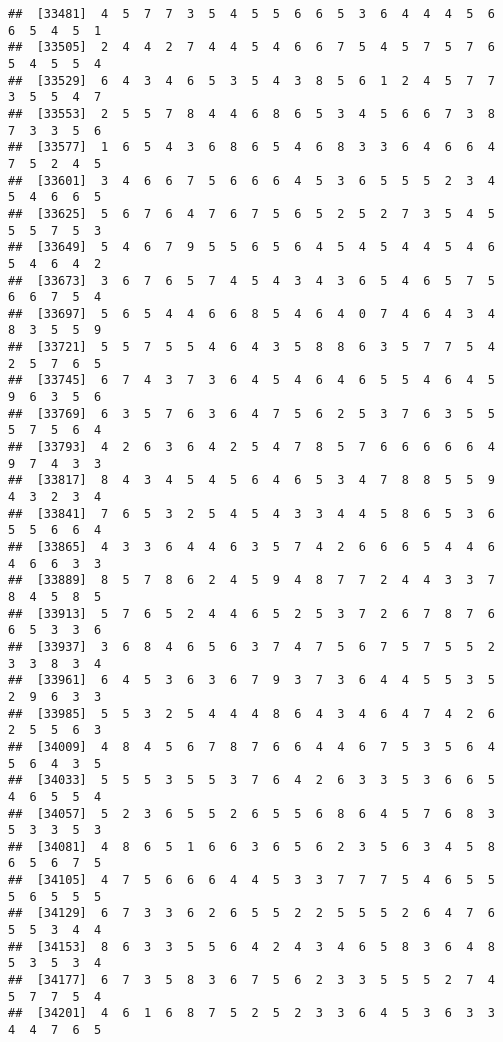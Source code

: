 \documentclass[
]{book}
\begin{document}
\begin{verbatim}
##  [33481]  4  5  7  7  3  5  4  5  5  6  6  5  3  6  4  4  4  5  6  6  5  4  5  1
##  [33505]  2  4  4  2  7  4  4  5  4  6  6  7  5  4  5  7  5  7  6  5  4  5  5  4
##  [33529]  6  4  3  4  6  5  3  5  4  3  8  5  6  1  2  4  5  7  7  3  5  5  4  7
##  [33553]  2  5  5  7  8  4  4  6  8  6  5  3  4  5  6  6  7  3  8  7  3  3  5  6
##  [33577]  1  6  5  4  3  6  8  6  5  4  6  8  3  3  6  4  6  6  4  7  5  2  4  5
##  [33601]  3  4  6  6  7  5  6  6  6  4  5  3  6  5  5  5  2  3  4  5  4  6  6  5
##  [33625]  5  6  7  6  4  7  6  7  5  6  5  2  5  2  7  3  5  4  5  5  5  7  5  3
##  [33649]  5  4  6  7  9  5  5  6  5  6  4  5  4  5  4  4  5  4  6  5  4  6  4  2
##  [33673]  3  6  7  6  5  7  4  5  4  3  4  3  6  5  4  6  5  7  5  6  6  7  5  4
##  [33697]  5  6  5  4  4  6  6  8  5  4  6  4  0  7  4  6  4  3  4  8  3  5  5  9
##  [33721]  5  5  7  5  5  4  6  4  3  5  8  8  6  3  5  7  7  5  4  2  5  7  6  5
##  [33745]  6  7  4  3  7  3  6  4  5  4  6  4  6  5  5  4  6  4  5  9  6  3  5  6
##  [33769]  6  3  5  7  6  3  6  4  7  5  6  2  5  3  7  6  3  5  5  5  7  5  6  4
##  [33793]  4  2  6  3  6  4  2  5  4  7  8  5  7  6  6  6  6  6  4  9  7  4  3  3
##  [33817]  8  4  3  4  5  4  5  6  4  6  5  3  4  7  8  8  5  5  9  4  3  2  3  4
##  [33841]  7  6  5  3  2  5  4  5  4  3  3  4  4  5  8  6  5  3  6  5  5  6  6  4
##  [33865]  4  3  3  6  4  4  6  3  5  7  4  2  6  6  6  5  4  4  6  4  6  6  3  3
##  [33889]  8  5  7  8  6  2  4  5  9  4  8  7  7  2  4  4  3  3  7  8  4  5  8  5
##  [33913]  5  7  6  5  2  4  4  6  5  2  5  3  7  2  6  7  8  7  6  6  5  3  3  6
##  [33937]  3  6  8  4  6  5  6  3  7  4  7  5  6  7  5  7  5  5  2  3  3  8  3  4
##  [33961]  6  4  5  3  6  3  6  7  9  3  7  3  6  4  4  5  5  3  5  2  9  6  3  3
##  [33985]  5  5  3  2  5  4  4  4  8  6  4  3  4  6  4  7  4  2  6  2  5  5  6  3
##  [34009]  4  8  4  5  6  7  8  7  6  6  4  4  6  7  5  3  5  6  4  5  6  4  3  5
##  [34033]  5  5  5  3  5  5  3  7  6  4  2  6  3  3  5  3  6  6  5  4  6  5  5  4
##  [34057]  5  2  3  6  5  5  2  6  5  5  6  8  6  4  5  7  6  8  3  5  3  3  5  3
##  [34081]  4  8  6  5  1  6  6  3  6  5  6  2  3  5  6  3  4  5  8  6  5  6  7  5
##  [34105]  4  7  5  6  6  6  4  4  5  3  3  7  7  7  5  4  6  5  5  5  6  5  5  5
##  [34129]  6  7  3  3  6  2  6  5  5  2  2  5  5  5  2  6  4  7  6  5  5  3  4  4
##  [34153]  8  6  3  3  5  5  6  4  2  4  3  4  6  5  8  3  6  4  8  5  3  5  3  4
##  [34177]  6  7  3  5  8  3  6  7  5  6  2  3  3  5  5  5  2  7  4  5  7  7  5  4
##  [34201]  4  6  1  6  8  7  5  2  5  2  3  3  6  4  5  3  6  3  3  4  4  7  6  5

\end{verbatim}
\end{document}
